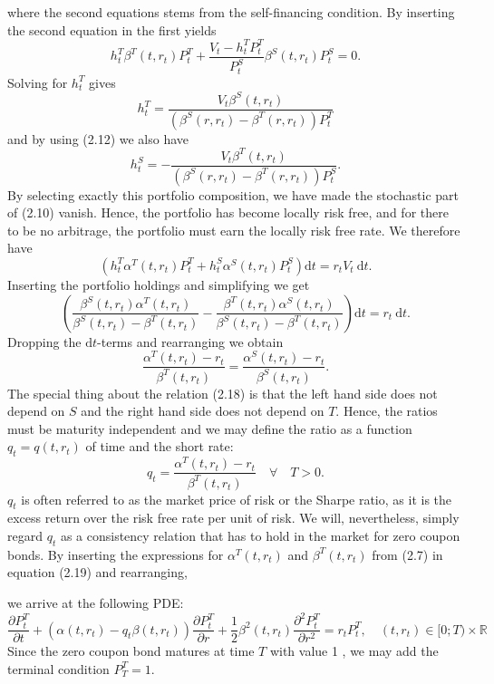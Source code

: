 \documentclass[12pt,twoside]{reedthesis}
\begin{document}
where the second equations stems from the self-financing condition. By inserting the second equation in the first yields
\[
h_{t}^{T} \beta^{T}\left(t, r_{t}\right) P_{t}^{T}+\frac{V_{t}-h_{t}^{T} P_{t}^{T}}{P_{t}^{S}} \beta^{S}\left(t, r_{t}\right) P_{t}^{S}=0 .
\]
Solving for \(h_{t}^{T}\) gives
\[
h_{t}^{T}=\frac{V_{t} \beta^{S}\left(t, r_{t}\right)}{\left(\beta^{S}\left(r, r_{t}\right)-\beta^{T}\left(r, r_{t}\right)\right) P_{t}^{T}}
\]
and by using (2.12) we also have
\[
h_{t}^{S}=-\frac{V_{t} \beta^{T}\left(t, r_{t}\right)}{\left(\beta^{S}\left(r, r_{t}\right)-\beta^{T}\left(r, r_{t}\right)\right) P_{t}^{S}} .
\]
By selecting exactly this portfolio composition, we have made the stochastic part of (2.10) vanish. Hence, the portfolio has become locally risk free, and for there to be no arbitrage, the portfolio must earn the locally risk free rate. We therefore have
\[
\left(h_{t}^{T} \alpha^{T}\left(t, r_{t}\right) P_{t}^{T}+h_{t}^{S} \alpha^{S}\left(t, r_{t}\right) P_{t}^{S}\right) \mathrm{d} t=r_{t} V_{t} \mathrm{~d} t .
\]
Inserting the portfolio holdings and simplifying we get
\[
\left(\frac{\beta^{S}\left(t, r_{t}\right) \alpha^{T}\left(t, r_{t}\right)}{\beta^{S}\left(t, r_{t}\right)-\beta^{T}\left(t, r_{t}\right)}-\frac{\beta^{T}\left(t, r_{t}\right) \alpha^{S}\left(t, r_{t}\right)}{\beta^{S}\left(t, r_{t}\right)-\beta^{T}\left(t, r_{t}\right)}\right) \mathrm{d} t=r_{t} \mathrm{~d} t .
\]
Dropping the \(\mathrm{d} t\)-terms and rearranging we obtain
\[
\frac{\alpha^{T}\left(t, r_{t}\right)-r_{t}}{\beta^{T}\left(t, r_{t}\right)}=\frac{\alpha^{S}\left(t, r_{t}\right)-r_{t}}{\beta^{S}\left(t, r_{t}\right)} .
\]
The special thing about the relation (2.18) is that the left hand side does not depend on \(S\) and the right hand side does not depend on \(T\). Hence, the ratios must be maturity independent and we may define the ratio as a function \(q_{t}=q\left(t, r_{t}\right)\) of time and the short rate:
\[
q_{t}=\frac{\alpha^{T}\left(t, r_{t}\right)-r_{t}}{\beta^{T}\left(t, r_{t}\right)} \quad \forall \quad T>0 .
\]
\(q_{t}\) is often referred to as the market price of risk or the Sharpe ratio, as it is the excess return over the risk free rate per unit of risk. We will, nevertheless, simply regard \(q_{t}\) as a consistency relation that has to hold in the market for zero coupon bonds. By inserting the expressions for \(\alpha^{T}\left(t, r_{t}\right)\) and \(\beta^{T}\left(t, r_{t}\right)\) from (2.7) in equation (2.19) and rearranging,

we arrive at the following PDE:
\[
\frac{\partial P_{t}^{T}}{\partial t}+\left(\alpha\left(t, r_{t}\right)-q_{t} \beta\left(t, r_{t}\right)\right) \frac{\partial P_{t}^{T}}{\partial r}+\frac{1}{2} \beta^{2}\left(t, r_{t}\right) \frac{\partial^{2} P_{t}^{T}}{\partial r^{2}}=r_{t} P_{t}^{T}, \quad\left(t, r_{t}\right) \in[0 ; T) \times \mathbb{R}
\]
Since the zero coupon bond matures at time \(T\) with value 1 , we may add the terminal condition \(P_{T}^{T}=1\).
\end{document}
